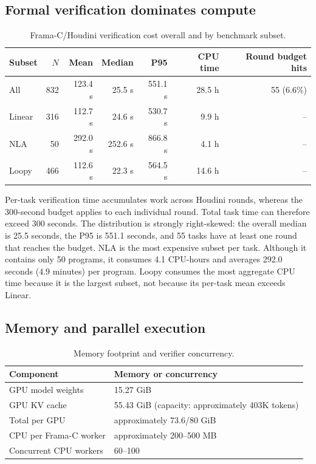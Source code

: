 \documentclass[10pt]{article}
\begin{document}
\subsection{Formal verification dominates compute}

\begin{table}[H]
\centering
\begin{tabular}{lrrrrrr}
\toprule
\rowcolor{headerbg}
Subset & \(N\) & Mean & Median & P95 & CPU time & Round budget hits \\
\midrule
All    & 832 & 123.4 s & 25.5 s  & 551.1 s & 28.5 h & 55 (6.6\%) \\
Linear & 316 & 112.7 s & 24.6 s  & 530.7 s & 9.9 h  & -- \\
NLA    & 50  & 292.0 s & 252.6 s & 866.8 s & 4.1 h  & -- \\
Loopy  & 466 & 112.6 s & 22.3 s  & 564.5 s & 14.6 h & -- \\
\bottomrule
\end{tabular}
\caption{Frama-C/Houdini verification cost overall and by benchmark subset.}
\label{tab:supp-resource-verification}
\end{table}

Per-task verification time accumulates work across Houdini rounds, whereas
the 300-second budget applies to each individual round.  Total task time can
therefore exceed 300 seconds.  The distribution is strongly right-skewed: the
overall median is 25.5 seconds, the P95 is 551.1 seconds, and 55 tasks have at
least one round that reaches the budget.  NLA is the most expensive subset per
task.  Although it contains only 50 programs, it consumes 4.1 CPU-hours and
averages 292.0 seconds (4.9 minutes) per program.  Loopy consumes the most
aggregate CPU time because it is the largest subset, not because its per-task
mean exceeds Linear.

\subsection{Memory and parallel execution}

\begin{table}[H]
\centering
\begin{tabular}{ll}
\toprule
\rowcolor{headerbg}
Component & Memory or concurrency \\
\midrule
GPU model weights          & 15.27 GiB \\
GPU KV cache               & 55.43 GiB (capacity: approximately 403K tokens) \\
Total per GPU              & approximately 73.6/80 GiB \\
CPU per Frama-C worker     & approximately 200--500 MB \\
Concurrent CPU workers     & 60--100 \\
\bottomrule
\end{tabular}
\caption{Memory footprint and verifier concurrency.}
\label{tab:supp-resource-memory}
\end{table}
\end{document}
